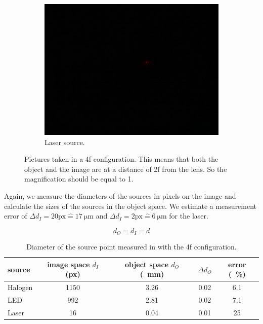 \documentclass[a4paper, 12pt]{paper}
\begin{document}
\begin{figure}[h]
\begin{subfigure}[p]{0.30\textwidth}
        \includegraphics[width=\textwidth]{img/laser_aperture}
        \caption{Laser source.}
    \end{subfigure}
    \caption{Pictures taken in a 4f configuration.
        This means that both the object and the image are at a distance of 2f from the lens.
    So the magnification should be equal to 1.}
\label{fig:sources_4f}
\end{figure}

Again, we measure the diameters of the sources in pixels on the image and calculate the sizes of the sources in the object space.
We estimate a measurement error of $\Delta d_I = 20 \mbox{px} \hat{=} \SI{17}{\micro\meter}$ and $\Delta d_I = 2 \mbox{px} \hat{=} \SI{6}{\micro\meter}$ for the laser.

\begin{equation}
    d_O = d_I = d
    \label{equ:m_of_one}
\end{equation}

\begin{table}[h]
    \centering
    \begin{tabular}{l S[table-format=4.0] S[table-format=1.2] S[table-format=1.2] S[table-format=2.1]}
        \toprule
        source & {image space $d_I$ (px)} & {object space $d_O$ (\SI{}{\milli\meter})} & {$\Delta d_O$} & {error (\SI{}{\percent})} \\
        \midrule
        Halogen & 1150 & 3.26 & 0.02 &  6.1 \\
        LED     &  992 & 2.81 & 0.02 &  7.1 \\
        Laser   &   16 & 0.04 & 0.01 & 25   \\
        \bottomrule
    \end{tabular}
    \caption{Diameter of the source point measured in with the 4f configuration.}
\label{tab:diams_4f}
\end{table}
\end{document}
